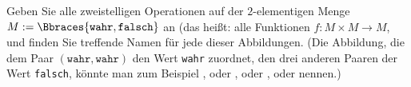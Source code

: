 
\begin{exercise}[16]

Geben Sie alle zweistelligen Operationen auf der $2$-elementigen Menge $M := \Bbraces{\texttt{wahr}, \texttt{falsch}}$ an (das heißt: alle Funktionen $f: M \times M \to M$, und finden Sie treffende Namen für jede dieser Abbildungen.
(Die Abbildung, die dem Paar $(\texttt{wahr}, \texttt{wahr})$ den Wert \texttt{wahr} zuordnet, den drei anderen Paaren der Wert \texttt{falsch}, könnte man zum Beispiel , oder , oder , oder  nennen.)

\end{exercise}


